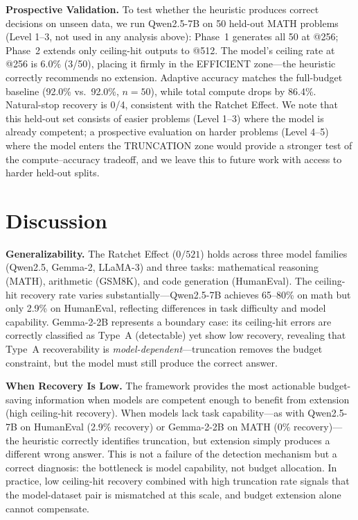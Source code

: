 \documentclass{article}
\begin{document}
\textbf{Prospective Validation.}
To test whether the heuristic produces correct decisions on unseen data, we run Qwen2.5-7B on 50 held-out MATH problems (Level 1--3, not used in any analysis above): Phase~1 generates all 50 at @256; Phase~2 extends only ceiling-hit outputs to @512. The model's ceiling rate at @256 is 6.0\% (3/50), placing it firmly in the EFFICIENT zone---the heuristic correctly recommends no extension. Adaptive accuracy matches the full-budget baseline (92.0\% vs.\ 92.0\%, $n=50$), while total compute drops by 86.4\%. Natural-stop recovery is 0/4, consistent with the Ratchet Effect. We note that this held-out set consists of easier problems (Level 1--3) where the model is already competent; a prospective evaluation on harder problems (Level 4--5) where the model enters the TRUNCATION zone would provide a stronger test of the compute--accuracy tradeoff, and we leave this to future work with access to harder held-out splits.

\section{Discussion}

\textbf{Generalizability.}
The Ratchet Effect ($0/521$) holds across three model families (Qwen2.5, Gemma-2, LLaMA-3) and three tasks: mathematical reasoning (MATH), arithmetic (GSM8K), and code generation (HumanEval). The ceiling-hit recovery rate varies substantially---Qwen2.5-7B achieves 65--80\% on math but only 2.9\% on HumanEval, reflecting differences in task difficulty and model capability. Gemma-2-2B represents a boundary case: its ceiling-hit errors are correctly classified as Type~A (detectable) yet show low recovery, revealing that Type~A recoverability is \emph{model-dependent}---truncation removes the budget constraint, but the model must still produce the correct answer.

\textbf{When Recovery Is Low.}
The framework provides the most actionable budget-saving information when models are competent enough to benefit from extension (high ceiling-hit recovery). When models lack task capability---as with Qwen2.5-7B on HumanEval (2.9\% recovery) or Gemma-2-2B on MATH (0\% recovery)---the heuristic correctly identifies truncation, but extension simply produces a different wrong answer. This is not a failure of the detection mechanism but a correct diagnosis: the bottleneck is model capability, not budget allocation. In practice, low ceiling-hit recovery combined with high truncation rate signals that the model-dataset pair is mismatched at this scale, and budget extension alone cannot compensate.
\end{document}
